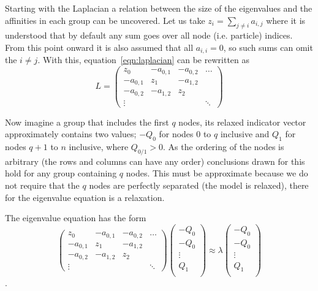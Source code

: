 Starting with the Laplacian a relation between the size of the eigenvalues and the affinities in each group can be uncovered.
Let us take \(z_i = \sum_{j\neq i} a_{i,j}\) where it is understood that by default any sum goes over all node (i.e. particle) indices.
From this point onward it is also assumed that all \(a_{i,i} = 0\), so such sums can omit the \(i \ne j\).
With this, equation~\ref{eqn:laplacian} can be rewritten as
\begin{equation}
    L = 
    \begin{pmatrix}
        z_0 & -a_{0,1} & -a_{0,2} & \hdots \\
        -a_{0,1} & z_1 & -a_{1,2} & \\
        -a_{0,2} & -a_{1,2} & z_2 & \\
        \vdots   &          &     & \ddots 
    \end{pmatrix}
\end{equation}

Now imagine a group that includes the first \(q\) nodes,
its relaxed indicator vector approximately contains two values; \(-Q_0\) for nodes \(0\) to \(q\) inclusive
and \(Q_1\) for nodes \(q+1\) to \(n\) inclusive,  where \(Q_{0/1} > 0\).
As the ordering of the nodes is arbitrary (the rows and columns can have any order)
conclusions drawn for this hold for any group containing \(q\) nodes.
This must be approximate because we do not require that the \(q\) nodes are perfectly separated (the model is relaxed),
there for the eigenvalue equation is a relaxation.

The eigenvalue equation has the form
\begin{equation}
    \begin{pmatrix}
        z_0 & -a_{0,1} & -a_{0,2} & \hdots \\
        -a_{0,1} & z_1 & -a_{1,2} & \\
        -a_{0,2} & -a_{1,2} & z_2 & \\
        \vdots   &          &     & \ddots 
    \end{pmatrix}
    \begin{pmatrix}
        -Q_0 \\
        -Q_0 \\
        \vdots \\
        Q_1 \\
    \end{pmatrix}
    \approx \lambda
    \begin{pmatrix}
        -Q_0 \\
        -Q_0 \\
        \vdots \\
        Q_1 \\
    \end{pmatrix}
\end{equation}.

